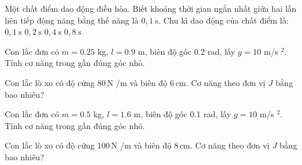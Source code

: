 \begin{ex}
Một chất điểm dao động điều hòa. Biết khoảng thời gian ngắn nhất giữa hai lần liên tiếp động năng bằng thế năng là $0,1\ \mathrm{s}$. Chu kì dao động của chất điểm là:
\choice
{$0,1\ \mathrm{s}$}
{$0,2\ \mathrm{s}$}
{\True $0,4\ \mathrm{s}$}
{$0,8\ \mathrm{s}$}
\end{ex}

\begin{bt}
Con lắc đơn có $m=0.25$ kg, $l=0.9$ m, biên độ góc 0.2 rad, lấy $g=10$ m/s $^2$. Tính cơ năng trong gần đúng góc nhỏ.
\end{bt}

\begin{ex}
Con lắc lò xo có độ cứng $80\,\text{N}$ /m và biên độ $6\,\text{cm}$. Cơ năng theo đơn vị $J$ bằng bao nhiêu?
\end{ex}


\begin{bt}
Con lắc đơn có $m=0.5$ kg, $l=1.6$ m, biên độ góc 0.1 rad, lấy $g=10$ m/s $^2$. Tính cơ năng trong gần đúng góc nhỏ.
\end{bt}

\begin{ex}
Con lắc lò xo có độ cứng $100\,\text{N}$ /m và biên độ $8\,\text{cm}$. Cơ năng theo đơn vị $J$ bằng bao nhiêu?
\end{ex}


